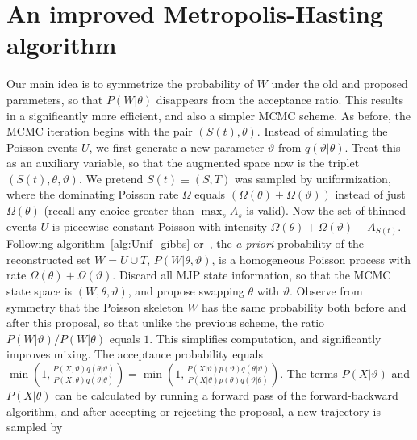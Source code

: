 
\section{An improved Metropolis-Hasting algorithm}
\vspace{-.05in}
Our main idea is to symmetrize the probability of $W$ under the old and 
proposed parameters, so that 
$P(W|\theta)$ disappears from the acceptance ratio. This results
in a significantly more efficient, and also a simpler MCMC scheme.
As before, the MCMC iteration begins with the pair $(S(t), \theta)$. 
Instead of simulating the Poisson events $U$, we first generate a new 
parameter $\vartheta$ from $q(\vartheta|\theta)$. Treat this as an 
auxiliary variable, so that the augmented space now is the triplet 
$(S(t), \theta,\vartheta)$. We pretend $S(t) \equiv (S,T)$ was sampled by  
uniformization, where the dominating Poisson rate $\Omega$ equals 
$(\Omega(\theta) + \Omega(\vartheta))$ instead of just $\Omega(\theta)$ 
(recall any choice greater than $\max_s A_s$ is valid).
Now the set of thinned events $U$ is piecewise-constant
Poisson with intensity $\Omega(\theta) + \Omega(\vartheta) - 
A_{S(t)}$. Following algorithm~\ref{alg:Unif_gibbs} or~\cite{RaoTeh13}, 
the {\em a priori} probability of the reconstructed set $W = U \cup T$, 
$P(W|\theta,\vartheta)$, is a homogeneous Poisson 
process with rate $\Omega(\theta) + \Omega(\vartheta)$. Discard all 
MJP state information, so that the MCMC state space is $(W, \theta, \vartheta)$,
and propose swapping $\theta$ with $\vartheta$. 
Observe from
symmetry that the Poisson skeleton $W$ has the same probability both
before and after this proposal, so that unlike the previous scheme,
the ratio $P(W|\vartheta)/P(W|\theta)$ equals $1$.  This simplifies 
computation, and significantly improves mixing.
The acceptance probability 
equals
$ 
  \min\left(1, \frac{P(X,\vartheta)q(\theta|\vartheta)}
   {P(X,\theta)q(\vartheta|\theta)}\right) = 
  \min\left(1, \frac{P(X|\vartheta)p(\vartheta)q(\theta|\vartheta)}
   {P(X|\theta)p(\theta)q(\vartheta|\theta)}\right).
   $
   The terms $P(X|\vartheta)$ and  $P(X|\theta)$ can be calculated by 
   running a forward pass of the forward-backward algorithm, and after
   accepting or rejecting the proposal, a new trajectory is sampled by
